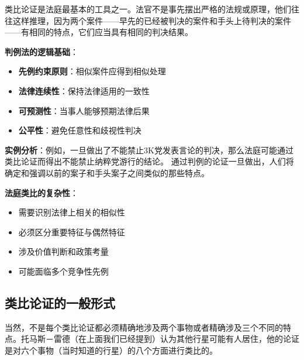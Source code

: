 \begin{theorembox}[title=法庭类比论证的特殊地位]
类比论证是法庭最基本的工具之一。法官不是事先摆出严格的法规或原理，他们往往这样推理，因为两个案件——早先的已经被判决的案件和手头上待判决的案件——有相同的特点，它们应当具有相同的判决结果。

\textbf{判例法的逻辑基础}：
\begin{itemize}
\item \textbf{先例约束原则}：相似案件应得到相似处理
\item \textbf{法律连续性}：保持法律适用的一致性
\item \textbf{可预测性}：当事人能够预期法律后果
\item \textbf{公平性}：避免任意性和歧视性判决
\end{itemize}

\textbf{实例分析}：例如，一旦做出了不能禁止3K党发表言论的判决，那么法庭可能通过类比论证而得出不能禁止纳粹党游行的结论。\cite{collin1978} 通过判例的论证一旦做出，人们将确定和强调以前的案子和手头案子之间类似的那些特点。

\textbf{法庭类比的复杂性}：
\begin{itemize}
\item 需要识别法律上相关的相似性
\item 必须区分重要特征与偶然特征
\item 涉及价值判断和政策考量
\item 可能面临多个竞争性先例
\end{itemize}
\end{theorembox}

\subsection{类比论证的一般形式}

当然，不是每个类比论证都必须精确地涉及两个事物或者精确涉及三个不同的特点。托马斯－雷德（在上面我们已经提到）认为其他行星可能有人居住，他的论证是对六个事物（当时知道的行星）的八个方面进行类比的。

